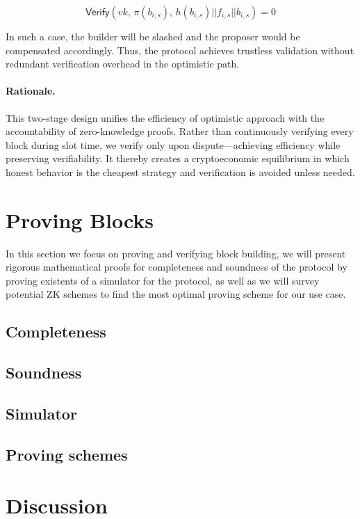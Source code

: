 \documentclass[11pt]{article}
\begin{document}
\[
\mathsf{Verify}(vk,\, \pi(b_{i,s}),\, h(b_{i,s}) || f_{i,s} || b_{i,s}) = 0
\]

In such a case, the builder will be slashed and the proposer would be compensated accordingly.
Thus, the protocol achieves trustless validation without redundant verification overhead in the optimistic path.




\paragraph{Rationale.}
This two-stage design unifies the efficiency of optimistic approach with the accountability of zero-knowledge proofs. Rather than continuously verifying every block during slot time, we verify only upon dispute—achieving efficiency while preserving verifiability. It thereby creates a cryptoeconomic equilibrium in which honest behavior is the cheapest strategy and verification is avoided unless needed.

\section{Proving Blocks}
\label{sec:proving_blocks}

In this section we focus on proving and verifying block building, we will present rigorous mathematical proofs for completeness and soundness of the protocol by proving existents of a simulator for the protocol, as well as we will survey potential ZK schemes to find the most optimal proving scheme for our use case.

\subsection{Completeness}
\subsection{Soundness}
\subsection{Simulator}
\subsection{Proving schemes}

\section{Discussion}
\label{sec:disscusion}
\end{document}
